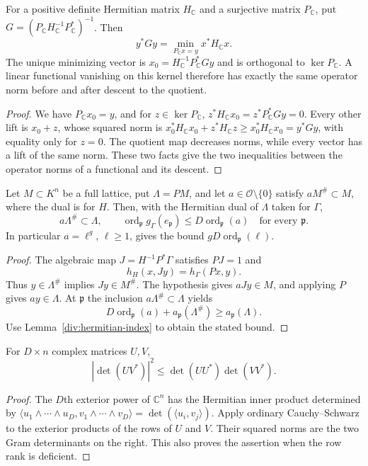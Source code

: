 \begin{lemma}\label{div:quotient-metric}
For a positive definite Hermitian matrix $H_{\mathbb C}$ and a surjective
matrix $P_{\mathbb C}$, put
$G=(P_{\mathbb C} H_{\mathbb C}^{-1}P_{\mathbb C}^*)^{-1}$. Then
\[
 y^*Gy=\min_{P_{\mathbb C}x=y}x^*H_{\mathbb C}x.
\]
The unique minimizing vector is
$x_0=H_{\mathbb C}^{-1}P_{\mathbb C}^*Gy$ and is orthogonal to
$\ker P_{\mathbb C}$. A linear functional vanishing on this kernel
therefore has exactly the same operator norm before and after descent
to the quotient.
\end{lemma}
\begin{proof}
We have $P_{\mathbb C}x_0=y$, and for $z\in\ker P_{\mathbb C}$,
$z^*H_{\mathbb C}x_0=z^*P_{\mathbb C}^*Gy=0$.
Every other lift is $x_0+z$, whose squared norm is
$x_0^*H_{\mathbb C}x_0+z^*H_{\mathbb C}z\ge x_0^*H_{\mathbb C}x_0=y^*Gy$,
with equality only for $z=0$. The quotient map decreases norms, while
every vector has a lift of the same norm. These two facts give the
two inequalities between the operator norms of a functional and its
descent.
\end{proof}

\begin{proposition}\label{div:local-bound}
Let $M\subset K^n$ be a full lattice, put $\Lambda=PM$, and let
$a\in\mathcal O\setminus\{0\}$ satisfy $aM^\#\subset M$, where the
dual is for $H$. Then, with the Hermitian dual of $\Lambda$ taken for
$\Gamma$,
\[
 a\Lambda^\#\subset\Lambda,
 \qquad
 \operatorname{ord}_{\mathfrak p}
       g_\Gamma(e_{\mathfrak p})
       \le D\operatorname{ord}_{\mathfrak p}(a)
       \quad\text{for every }\mathfrak p.
\]
In particular $a=\ell^g$, $\ell\ge1$, gives the bound
$gD\operatorname{ord}_{\mathfrak p}(\ell)$.
\end{proposition}
\begin{proof}
The algebraic map $J=H^{-1}P^*\Gamma$ satisfies $PJ=1$ and
\[
 h_H(x,Jy)=h_\Gamma(Px,y).
\]
Thus $y\in\Lambda^\#$ implies $Jy\in M^\#$. The hypothesis gives
$aJy\in M$, and applying $P$ gives $ay\in\Lambda$.
At $\mathfrak p$ the inclusion $a\Lambda^\#\subset\Lambda$ yields
\[
 D\operatorname{ord}_{\mathfrak p}(a)
       +a_{\mathfrak p}(\Lambda^\#)
       \ge a_{\mathfrak p}(\Lambda).
\]
Use Lemma~\ref{div:hermitian-index} to obtain the stated bound.
\end{proof}

\begin{lemma}\label{div:det-cs}
For $D\times n$ complex matrices $U,V$,
\[
 |\det(UV^*)|^2\le\det(UU^*)\det(VV^*).
\]
\end{lemma}
\begin{proof}
The $D$th exterior power of $\mathbb C^n$ has the Hermitian inner
product determined by
$\langle u_1\wedge\cdots\wedge u_D,
v_1\wedge\cdots\wedge v_D\rangle
=\det(\langle u_i,v_j\rangle)$.
Apply ordinary Cauchy--Schwarz to the exterior products of the rows of
$U$ and $V$. Their squared norms are the two Gram determinants on the
right. This also proves the assertion when the row rank is deficient.
\end{proof}

